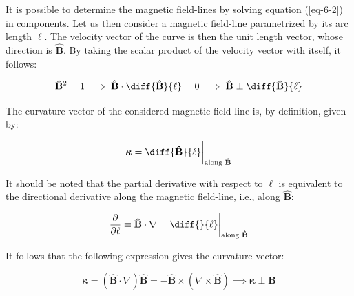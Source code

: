 It is possible to determine the magnetic field-lines by solving equation (\ref{eq-6-2}) in components. Let us then consider a magnetic field-line parametrized by its arc length $\ell$. The velocity vector of the curve is then the unit length vector, whose direction is $\mathbf{\hat{B}}$. By taking the scalar product of the velocity vector with itself, it follows:

\begin{equation}
    \mathbf{\hat{B}}^2=1\implies\mathbf{\hat{B}}\cdot\diff{\mathbf{\hat{B}}}{\ell}=0\implies\mathbf{\hat{B}}\perp\diff{\mathbf{\hat{B}}}{\ell}
\end{equation}

The curvature vector of the considered magnetic field-line is, by definition, given by:

\begin{equation}
    \boldsymbol{\kappa}=\diff{\mathbf{\hat{B}}}{\ell}\biggr|_{\text{along }\mathbf{\hat{B}}}
\end{equation}

It should be noted that the partial derivative with respect to $\ell$ is equivalent to the directional derivative along the magnetic field-line, i.e., along $\mathbf{\hat{B}}$:

\begin{equation}
    \frac{\partial}{\partial\ell}\equiv\mathbf{\hat{B}}\cdot\nabla=\diff{}{\ell}\biggr|_{\text{along }\mathbf{\hat{B}}}
\end{equation}

It follows that the following expression gives the curvature vector:

\begin{equation}
    \boldsymbol{\kappa}=(\mathbf{\hat{B}}\cdot\nabla)\mathbf{\hat{B}}=-\mathbf{\hat{B}}\times(\nabla\times\mathbf{\hat{B}})\implies\boldsymbol{\kappa}\perp\mathbf{B}
\end{equation}

